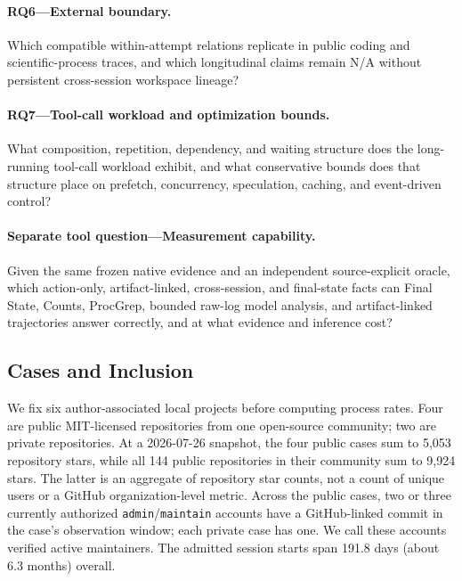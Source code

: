 \documentclass[letterpaper]{article}
\begin{document}
\paragraph{RQ6---External boundary.}
Which compatible within-attempt relations replicate in public coding and
scientific-process traces, and which longitudinal claims remain N/A without
persistent cross-session workspace lineage?

\paragraph{RQ7---Tool-call workload and optimization bounds.}
What composition, repetition, dependency, and waiting structure does the
long-running tool-call workload exhibit, and what conservative bounds does
that structure place on prefetch, concurrency, speculation, caching, and
event-driven control?

\paragraph{Separate tool question---Measurement capability.}
Given the same frozen native evidence and an independent source-explicit
oracle, which action-only, artifact-linked, cross-session, and final-state
facts can Final State, Counts, ProcGrep, bounded raw-log model analysis, and
artifact-linked trajectories answer correctly, and at what evidence and
inference cost?

\subsection{Cases and Inclusion}

We fix six author-associated local projects before computing process rates.
Four are public MIT-licensed repositories from one open-source community; two
are private repositories.  At a 2026-07-26 snapshot, the four public cases
sum to 5,053 repository stars, while all 144 public repositories in their
community sum to 9,924 stars.  The latter is an aggregate of repository star
counts, not a count of unique users or a GitHub organization-level metric.
Across the public cases, two or three currently authorized
\texttt{admin}/\texttt{maintain} accounts have a GitHub-linked commit in the
case's observation window; each private case has one.  We call these accounts
verified active maintainers.  The admitted session starts span 191.8 days
(about 6.3 months) overall.
\end{document}
